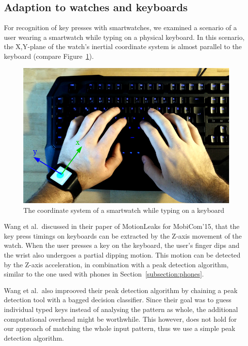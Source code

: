\subsection{Adaption to watches and keyboards}
For recognition of key presses with smartwatches, we examined a scenario of a user wearing a smartwatch while typing on a physical keyboard. In this scenario, the X,Y-plane of the watch's inertial coordinate system is almost parallel to the keyboard (compare Figure~\ref{fig:watchcoordinate}).

\begin{figure}
    \centering
    \includegraphics[width=\textwidth]{figures/WatchCoordinateSystem.png}
    \caption{The coordinate system of a smartwatch while typing on a keyboard}
    \label{fig:watchcoordinate}
\end{figure}

Wang et al.\cite{wang2015mole}\ discussed in their paper of MotionLeaks for MobiCom'15, that the key press timings on keyboards can be extracted by the Z-axis movement of the watch. When the user presses a key on the keyboard, the user's finger dips and the wrist also undergoes a partial dipping motion. This motion can be detected by the Z-axis acceleration, in combination with a peak detection algorithm, similar to the one used with phones in Section~\ref{subsection:phones}.

Wang et al.\ also improoved their peak detection algorithm by chaining a peak detection tool with a bagged decision classifier. Since their goal was to guess individual typed keys instead of analysing the pattern as whole, the additional computational overhead might be worthwhile. This however, does not hold for our approach of matching the whole  input pattern, thus we use a simple peak detection algorithm.

